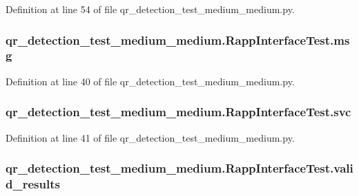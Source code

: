 Definition at line 54 of file qr\-\_\-detection\-\_\-test\-\_\-medium\-\_\-medium.\-py.

\hypertarget{classqr__detection__test__medium__medium_1_1RappInterfaceTest_a38316eaef4a7afdd3cac85873a6b2a6a}{
\subsubsection[{msg}]{\setlength{\rightskip}{0pt plus 5cm}qr\-\_\-detection\-\_\-test\-\_\-medium\-\_\-medium.\-Rapp\-Interface\-Test.\-msg}}\label{classqr__detection__test__medium__medium_1_1RappInterfaceTest_a38316eaef4a7afdd3cac85873a6b2a6a}


Definition at line 40 of file qr\-\_\-detection\-\_\-test\-\_\-medium\-\_\-medium.\-py.

\hypertarget{classqr__detection__test__medium__medium_1_1RappInterfaceTest_abcc071a89958914490cfc1bf8db9f0e1}{
\subsubsection[{svc}]{\setlength{\rightskip}{0pt plus 5cm}qr\-\_\-detection\-\_\-test\-\_\-medium\-\_\-medium.\-Rapp\-Interface\-Test.\-svc}}\label{classqr__detection__test__medium__medium_1_1RappInterfaceTest_abcc071a89958914490cfc1bf8db9f0e1}


Definition at line 41 of file qr\-\_\-detection\-\_\-test\-\_\-medium\-\_\-medium.\-py.

\hypertarget{classqr__detection__test__medium__medium_1_1RappInterfaceTest_a6a60ed7cde7aa3fc6ed3d451f80b187c}{
\subsubsection[{valid\-\_\-results}]{\setlength{\rightskip}{0pt plus 5cm}qr\-\_\-detection\-\_\-test\-\_\-medium\-\_\-medium.\-Rapp\-Interface\-Test.\-valid\-\_\-results}}\label{classqr__detection__test__medium__medium_1_1RappInterfaceTest_a6a60ed7cde7aa3fc6ed3d451f80b187c}


